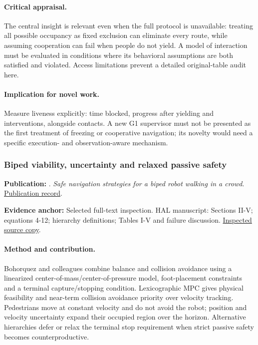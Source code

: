 \paragraph{Critical appraisal.} The central insight is relevant even when the full protocol is unavailable: treating all possible occupancy as fixed exclusion can eliminate every route, while assuming cooperation can fail when people do not yield. A model of interaction must be evaluated in conditions where its behavioral assumptions are both satisfied and violated. Access limitations prevent a detailed original-table audit here.

\paragraph{Implication for novel work.} Measure liveness explicitly: time blocked, progress after yielding and interventions, alongside contacts. A new G1 supervisor must not be presented as the first treatment of freezing or cooperative navigation; its novelty would need a specific execution- and observation-aware mechanism.

\subsubsection{Biped viability, uncertainty and relaxed passive safety}\label{paper:biped2016}
\textbf{Publication:} \citet{biped2016}. \emph{Safe navigation strategies for a biped robot walking in a crowd}. \href{https://doi.org/10.1109/humanoids.2016.7803304}{Publication record}.

\textbf{Evidence anchor:} Selected full-text inspection. HAL manuscript: Sections II-V; equations 4-12; hierarchy definitions; Tables I-V and failure discussion. \href{https://inria.hal.science/hal-01418340/document}{Inspected source copy}.

\paragraph{Method and contribution.} Bohorquez and colleagues combine balance and collision avoidance using a linearized center-of-mass/center-of-pressure model, foot-placement constraints and a terminal capture/stopping condition. Lexicographic MPC gives physical feasibility and near-term collision avoidance priority over velocity tracking. Pedestrians move at constant velocity and do not avoid the robot; position and velocity uncertainty expand their occupied region over the horizon. Alternative hierarchies defer or relax the terminal stop requirement when strict passive safety becomes counterproductive.

